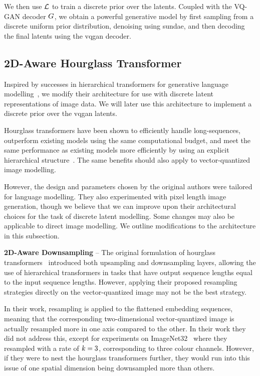 We then use $\mathcal{L}$ to train a discrete prior over the latents. Coupled
with the VQ-GAN decoder $G$, we obtain a powerful generative model
by first sampling from a discrete uniform prior distribution, denoising using
\gls{sundae}, and then decoding the final latents using the \gls{vqgan} decoder.

\subsection{2D-Aware Hourglass Transformer}
Inspired by successes in hierarchical transformers for generative language
modelling~\cite{nawrot2021hierarchical}, we modify their architecture for use
with discrete latent representations of image data. We will later use this
architecture to implement a discrete prior over the \gls{vqgan} latents. 

Hourglass transformers have been shown to efficiently handle long-sequences,
outperform existing models using the same computational budget, and meet the
same performance as existing models more efficiently by using an explicit
hierarchical structure~\cite{nawrot2021hierarchical}. The same benefits should
also apply to vector-quantized image modelling. 

However, the design and parameters chosen by the original authors were tailored
for language modelling. They also experimented with pixel length image
generation, though we believe that we can improve upon their architectural
choices for the task of discrete latent modelling. Some changes may also be
applicable to direct image modelling. We outline modifications to the
architecture in this subsection.

\textbf{2D-Aware Downsampling} -- The original formulation of hourglass
transformers~\cite{nawrot2021hierarchical} introduced both upsampling and
downsampling layers, allowing the use of hierarchical transformers in tasks that
have output sequence lengths equal to the input sequence lengths. However,
applying their proposed resampling strategies directly on the vector-quantized
image may not be the best strategy. 

In their work, resampling is applied to the flattened embedding sequences,
meaning that the corresponding two-dimensional vector-quantized image is
actually resampled more in one axis compared to the other. In their work they
did not address this, except for experiments on
ImageNet32~\cite{russakovsky2015imagenet} where they resampled with a rate of
$k=3$, corresponding to three colour channels. However, if they
were to nest the hourglass transformers further, they would run into this issue
of one spatial dimension being downsampled more than others.

